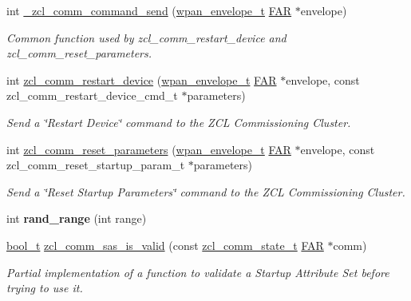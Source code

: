 \begin{DoxyCompactItemize}
int \hyperlink{group__zcl__commissioning_gab653d2ac290d96d3131c894f7330fbb6}{\+\_\+zcl\+\_\+comm\+\_\+command\+\_\+send} (\hyperlink{structwpan__envelope__t}{wpan\+\_\+envelope\+\_\+t} \hyperlink{group__hal_gaef060b3456fdcc093a7210a762d5f2ed}{F\+AR} $\ast$envelope)
\begin{DoxyCompactList}\small\item\em Common function used by zcl\+\_\+comm\+\_\+restart\+\_\+device and zcl\+\_\+comm\+\_\+reset\+\_\+parameters. \end{DoxyCompactList}\item 
int \hyperlink{group__zcl__commissioning_ga891e67720dee8334b805756597a62607}{zcl\+\_\+comm\+\_\+restart\+\_\+device} (\hyperlink{structwpan__envelope__t}{wpan\+\_\+envelope\+\_\+t} \hyperlink{group__hal_gaef060b3456fdcc093a7210a762d5f2ed}{F\+AR} $\ast$envelope, const zcl\+\_\+comm\+\_\+restart\+\_\+device\+\_\+cmd\+\_\+t $\ast$parameters)
\begin{DoxyCompactList}\small\item\em Send a \char`\"{}\+Restart Device\char`\"{} command to the Z\+CL Commissioning Cluster. \end{DoxyCompactList}\item 
int \hyperlink{group__zcl__commissioning_ga3d73d7ef453da4940c923d7d7663f8d9}{zcl\+\_\+comm\+\_\+reset\+\_\+parameters} (\hyperlink{structwpan__envelope__t}{wpan\+\_\+envelope\+\_\+t} \hyperlink{group__hal_gaef060b3456fdcc093a7210a762d5f2ed}{F\+AR} $\ast$envelope, const zcl\+\_\+comm\+\_\+reset\+\_\+startup\+\_\+param\+\_\+t $\ast$parameters)
\begin{DoxyCompactList}\small\item\em Send a \char`\"{}\+Reset Startup Parameters\char`\"{} command to the Z\+CL Commissioning Cluster. \end{DoxyCompactList}\item 
\mbox{\label{group__zcl__commissioning_ga54e8b0e19100923272edbfcfec798409}} 
int {\bfseries rand\+\_\+range} (int range)
\item 
\hyperlink{group__hal__dos_ga04dd5074964518403bf944f2b240a5f8}{bool\+\_\+t} \hyperlink{group__zcl__commissioning_ga91a578cd65163c738bd57a4249955c05}{zcl\+\_\+comm\+\_\+sas\+\_\+is\+\_\+valid} (const \hyperlink{structzcl__comm__state__t}{zcl\+\_\+comm\+\_\+state\+\_\+t} \hyperlink{group__hal_gaef060b3456fdcc093a7210a762d5f2ed}{F\+AR} $\ast$comm)
\begin{DoxyCompactList}\small\item\em Partial implementation of a function to validate a Startup Attribute Set before trying to use it. \end{DoxyCompactList}\item 

\end{DoxyCompactItemize}

